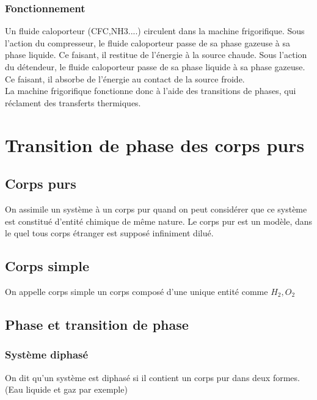 \subsection{Fonctionnement}
Un fluide caloporteur (CFC,NH3....) circulent dans la machine frigorifique. Sous l'action du compresseur, le fluide caloporteur passe de sa phase gazeuse à sa phase liquide. Ce faisant, il restitue de l'énergie à la source chaude. Sous l'action du détendeur, le fluide caloporteur passe de sa phase liquide à sa phase gazeuse. Ce faisant, il absorbe de l'énergie au contact de la source froide.\\
La machine frigorifique fonctionne donc à l'aide des transitions de phases, qui réclament des transferts thermiques.
\chapter{Transition de phase des corps purs}
\section{Corps purs}
\begin{de}
 On assimile un système à un corps pur quand on peut considérer que ce système est constitué d'entité chimique de même nature. Le corps pur est un modèle, dans le quel tous corps étranger est supposé infiniment dilué.
\end{de}
\section{Corps simple}
\begin{de}
 On appelle corps simple un corps composé d'une unique entité comme $H_2,O_2$
\end{de}
\section{Phase et transition de phase}
\subsection{Système diphasé}
\begin{de}
 On dit qu'un système est diphasé si il contient un corps pur dans deux formes. (Eau liquide et gaz par exemple)
\end{de}
